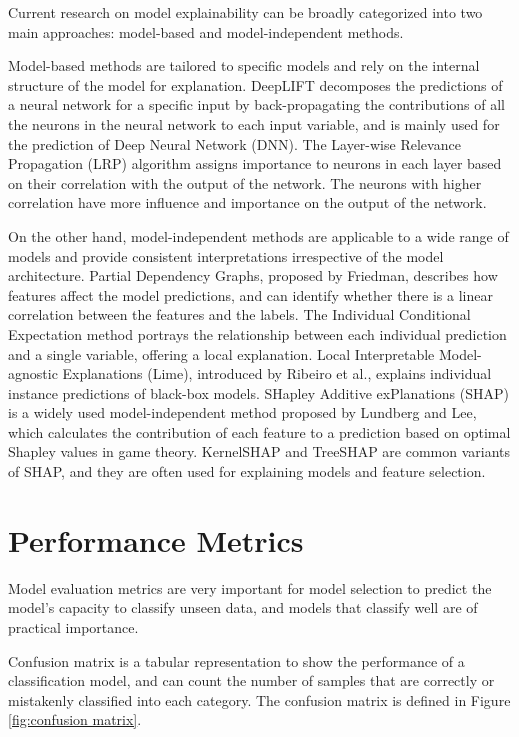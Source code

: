 \documentclass[ %
                    author={Bocheng Wang},
                supervisor={Dr. Qiang Liu},
                    degree={MSc},
                     title={A Research on Identification of Suicide Ideation in Texts with Multiple Models},
                      type={},
                      year={2024}]{dissertation}
\begin{document}
Current research on model explainability can be broadly categorized into two main approaches: model-based and model-independent methods.

Model-based methods are tailored to specific models and rely on the internal structure of the model for explanation. DeepLIFT\cite{shrikumar2017learning} decomposes the predictions of a neural network for a specific input by back-propagating the contributions of all the neurons in the neural network to each input variable, and is mainly used for the prediction of Deep Neural Network (DNN). The Layer-wise Relevance Propagation (LRP) algorithm\cite{bach2015pixel} assigns importance to neurons in each layer based on their correlation with the output of the network. The neurons with higher correlation have more influence and importance on the output of the network.

On the other hand, model-independent methods are applicable to a wide range of models and provide consistent interpretations irrespective of the model architecture. Partial Dependency Graphs, proposed by Friedman\cite{friedman2001greedy}, describes how features affect the model predictions, and can identify whether there is a linear correlation between the features and the labels. The Individual Conditional Expectation method\cite{goldstein2015peeking} portrays the relationship between each individual prediction and a single variable, offering a local explanation. Local Interpretable Model-agnostic Explanations (Lime), introduced by Ribeiro et al.\cite{ribeiro2016should}, explains individual instance predictions of black-box models. SHapley Additive exPlanations (SHAP) is a widely used model-independent method proposed by Lundberg and Lee\cite{lundberg2017unified}, which calculates the contribution of each feature to a prediction based on optimal Shapley values in game theory\cite{1953A}. KernelSHAP\cite{lundberg2017unified} and TreeSHAP\cite{lundberg2020local} are common variants of SHAP, and they are often used for explaining models and feature selection\cite{marcilio2020explanations}.

\section{Performance Metrics}
\noindent
Model evaluation metrics are very important for model selection to predict the model's capacity to classify unseen data, and models that classify well are of practical importance. 

Confusion matrix\cite{1997Selecting} is a tabular representation to show the performance of a classification model, and can count the number of samples that are correctly or mistakenly classified into each category. The confusion matrix is defined in Figure \ref{fig:confusion matrix}.
\end{document}

